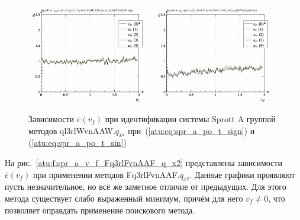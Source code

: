 \begin{figure}[htb!]
  \centerline{
    \includegraphics[width=0.49\textwidth]{p/cha/spr_a/ql3rlWvnAAW_x2/sprott_a_id-p_v_f_sign.png}
    \hfill
    \includegraphics[width=0.49\textwidth]{p/cha/spr_a/ql3rlWvnAAW_x2/sprott_a_id-p_v_f_sin.png}
  }
  \caption{Зависимости $\overline{e}(v_f)$ при идентификации системы Sprott A группой методов ql3rlWvnAAW.$q_{x^2}$
   при~(\ref{atu:eq:spr_a_po_t_sign}) и (\ref{atu:eq:spr_a_po_t_sin})}
  \label{atu:f:spr_a_v_f_ql3rlWvnAAW_q_x2}
\end{figure}

На рис.~\ref{atu:f:spr_a_v_f_Fq3rlFvnAAF_q_x2} представлены зависимости
$\overline{e}(v_f)$ при применении методов Fq3rlFvnAAF.$q_{x^2}$.
Данные графики проявляют пусть незначительное,
но всё же заметное отличие от предыдущих.
Для этого метода существует слабо выраженный минимум,
причём для него $v_f \ne 0 $, что позволяет
оправдать применение поискового метода.

